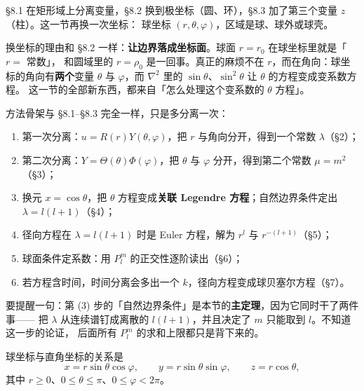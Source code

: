 \label{sec:s0}

§8.1 在矩形域上分离变量，§8.2 换到极坐标（圆、环），§8.3 加了第三个变量 $z$（柱）。这一节再换一次坐标：
球坐标 $(r,\theta,\varphi)$，区域是球、球外或球壳。

换坐标的理由和 §8.2 一样：\textbf{让边界落成坐标面}。球面 $r=r_0$ 在球坐标里就是「$r=$ 常数」，
和圆域里的 $r=\rho_0$ 是一回事。真正的麻烦不在 $r$，而在角向：球坐标的角向有\textbf{两个}变量
$\theta$ 与 $\varphi$，而 $\nabla^2$ 里的 $\sin\theta$、$\sin^2\theta$ 让 $\theta$ 的方程变成变系数方程。
这一节的全部新东西，都来自「怎么处理这个变系数的 $\theta$ 方程」。

方法骨架与 §8.1--§8.3 完全一样，只是多分离一次：

\begin{enumerate}[label=\textbf{(\arabic*)}]
  \item 第一次分离：$u=R(r)Y(\theta,\varphi)$，把 $r$ 与角向分开，得到一个常数 $\lambda$（\S2）；
  \item 第二次分离：$Y=\Theta(\theta)\Phi(\varphi)$，把 $\theta$ 与 $\varphi$ 分开，得到第二个常数 $\mu=m^2$（\S3）；
  \item 换元 $x=\cos\theta$，把 $\theta$ 方程变成\textbf{关联 Legendre 方程}；自然边界条件定出 $\lambda=l(l+1)$（\S4）；
  \item 径向方程在 $\lambda=l(l+1)$ 时是 Euler 方程，解为 $r^{l}$ 与 $r^{-(l+1)}$（\S5）；
  \item 球面条件定系数：用 $P_l^m$ 的正交性逐阶读出（\S6）；
  \item 若方程含时间，时间分离会多出一个 $k$，径向方程变成球贝塞尔方程（\S7）。
\end{enumerate}

要提醒一句：第 (3) 步的「自然边界条件」是本节的\textbf{主定理}，因为它同时干了两件事——
把 $\lambda$ 从连续谱钉成离散的 $l(l+1)$，并且决定了 $m$ 只能取到 $l$。不知道这一步的论证，
后面所有 $P_l^m$ 的求和上限都只是背下来的。

\label{sec:s1}


球坐标与直角坐标的关系是
\[
x=r\sin\theta\cos\varphi,\qquad
y=r\sin\theta\sin\varphi,\qquad
z=r\cos\theta,
\]
其中 $r\ge0$、$0\le\theta\le\pi$、$0\le\varphi<2\pi$。

